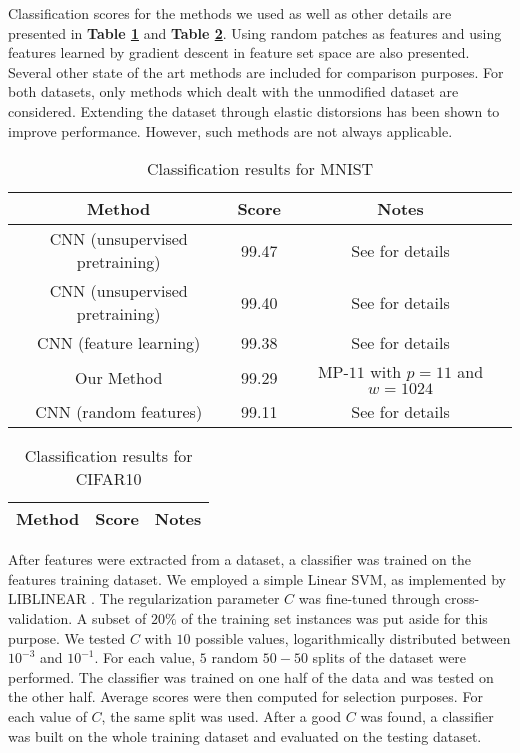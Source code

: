 \documentclass[runningheads,a4paper]{llncs}
\begin{document}
Classification scores for the methods we used as well as other details are presented in \textbf{Table \ref{table:ResultsMNIST}} and \textbf{Table \ref{table:ResultsCIFAR10}}. Using random patches as features and using features learned by gradient descent in feature set space are also presented. Several other state of the art methods are included for comparison purposes. For both datasets, only methods which dealt with the unmodified dataset are considered. Extending the dataset through elastic distorsions \cite{best-practices-cnn} has been shown to improve performance. However, such methods are not always applicable.

\renewcommand{\arraystretch}{1.5}
\begin{table}
  \caption{Classification results for MNIST}
  \label{table:ResultsMNIST}
  \begin{tabular*}{\textwidth}{|c|c|c|}
    \hline
    Method & Score & Notes \\ \hline\hline
    CNN (unsupervised pretraining) & 99.47 & See \cite{best-architecture-object-recognition} for details \\ \hline
    CNN (unsupervised pretraining) & 99.40 & See \cite{efficient-learning-sparse-energy-model} for details \\ \hline
    CNN (feature learning) & 99.38 & See \cite{} for details \\ \hline
    Our Method & 99.29 & MP-$11$ with $p=11$ and $w=1024$ \\ \hline
    CNN (random features) & 99.11 & See \cite{} for details \\ \hline
  \end{tabular*}
\end{table}
\renewcommand{\arraystretch}{1.0}

\renewcommand{\arraystretch}{1.5}
\begin{table}
  \caption{Classification results for CIFAR10}
  \label{table:ResultsCIFAR10}
  \begin{tabularx}{\textwidth}{|X|X|X|}
    \hline
    Method & Score & Notes \\
    \hline
  \end{tabularx}
\end{table}
\renewcommand{\arraystretch}{1.0}

After features were extracted from a dataset, a classifier was trained on the features training dataset. We employed a simple Linear SVM, as implemented by LIBLINEAR \cite{liblinear}. The regularization parameter $C$ was fine-tuned through cross-validation. A subset of $20\%$ of the training set instances was put aside for this purpose. We tested $C$ with $10$ possible values, logarithmically distributed between $10^{-3}$ and $10^{-1}$. For each value, $5$ random $50-50$ splits of the dataset were performed. The classifier was trained on one half of the data and was tested on the other half. Average scores were then computed for selection purposes. For each value of $C$, the same split was used. After a good $C$ was found, a classifier was built on the whole training dataset and evaluated on the testing dataset.
\end{document}
